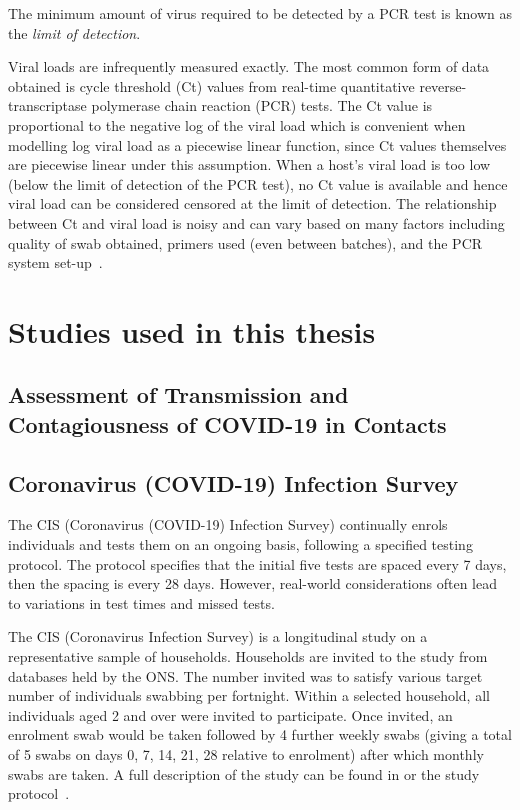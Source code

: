\documentclass[thesis.tex]{subfiles}
\begin{document}
The minimum amount of virus required to be detected by a PCR test is known as the \emph{limit of detection}.

Viral loads are infrequently measured exactly.
The most common form of data obtained is cycle threshold (Ct) values from real-time quantitative  reverse-transcriptase polymerase chain reaction (PCR) tests.
The Ct value is proportional to the negative log of the viral load which is convenient when modelling log viral load as a piecewise linear function, since Ct values themselves are piecewise linear under this assumption.
When a host's viral load is too low (below the limit of detection of the PCR test), no Ct value is available and hence viral load can be considered censored at the limit of detection.
The relationship between Ct and viral load is noisy and can vary based on many factors including quality of swab obtained, primers used (even between batches), and the PCR system set-up~\autocites{dahdouhCt,hanRTPCR}.


\section{Studies used in this thesis} \label{biology-data:sec:studies}

\subsection{Assessment of Transmission and Contagiousness of COVID-19 in Contacts}

\subsection{Coronavirus (COVID-19) Infection Survey} \label{intro:sec:cis}

The CIS (Coronavirus (COVID-19) Infection Survey) continually enrols individuals and tests them on an ongoing basis, following a specified testing protocol.
The protocol specifies that the initial five tests are spaced every 7 days, then the spacing is every 28 days.
However, real-world considerations often lead to variations in test times and missed tests.

The CIS (Coronavirus Infection Survey) is a longitudinal study on a representative sample of households.
Households are invited to the study from databases held by the ONS.
The number invited was to satisfy various target number of individuals swabbing per fortnight.
Within a selected household, all individuals aged 2 and over were invited to participate.
Once invited, an enrolment swab would be taken followed by 4 further weekly swabs (giving a total of 5 swabs on days 0, 7, 14, 21, 28 relative to enrolment) after which monthly swabs are taken.
A full description of the study can be found in \textcite[][supplementary materials]{pouwelsCommunity} or the study protocol~\autocite{cisProtocol}.
\end{document}
